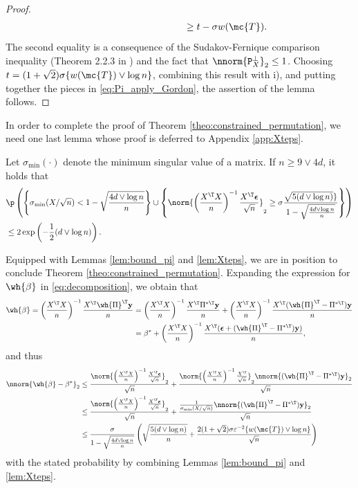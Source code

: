 \documentclass[11pt]{article}
\DeclareMathOperator{\pr}{\texttt{P}}
\def\y{\mathbf{y}}
\def\eps{\boldsymbol{\epsilon}}
\def\epss{\varepsilon}
\begin{document}
\begin{proof}
\begin{align*}
&\qquad \qquad \qquad \qquad \qquad \;\; \geq  t - \sigma w(\mc{T}). 
\end{align*}
The second equality is a consequence of the Sudakov-Fernique comparison inequality (Theorem 2.2.3 in \cite{AdlerTaylor2007}) and the fact that
$\nnorm{\pr_X^{\perp}}_2 \leq 1$. Choosing $t = (1 + \sqrt{2}) \sigma \{w(\mc{T}) \vee \log n \}$, combining this result with i), and putting together the pieces in \eqref{eq:Pi_apply_Gordon}, the assertion of the lemma follows.   
\end{proof}
\noindent In order to complete the proof of Theorem \ref{theo:constrained_permutation}, we need one last lemma whose proof is deferred to Appendix \ref{app:Xteps}.

\begin{lemma}\label{lem:Xteps} Let $\sigma_{\min}(\cdot)$ denote the minimum singular value of a matrix. If $n \geq 9 \vee 4d$, it holds that
\begin{align*}
  &\p \left( \left \{\sigma_{\min}(X / \sqrt{n}) < 1 - \sqrt{\frac{4 d \vee \log n}{n}} \right \}   \cup \left\{ \norm{ \left(\frac{X^{\T} X}{n} \right)^{-1} \frac{X^{\T} \eps}{\sqrt{n}}}_2 \geq \sigma \frac{\sqrt{5 (d \vee \log n)} \}}{1 - \sqrt{\frac{4 d \vee \log n}{n}}} \right \} \right)\\
  &\leq 2 \exp \left(-\frac{1}{2} (d \vee \log n) \right).  
\end{align*}
\end{lemma}
\noindent Equipped with Lemmas \ref{lem:bound_pi} and \ref{lem:Xteps}, we are in position to conclude
Theorem \ref{theo:constrained_permutation}. Expanding the expression for $\wh{\beta}$ in \eqref{eq:decomposition}, we obtain that
\begin{align*}
  \wh{\beta} = \left(\frac{X^{\T} X}{n} \right)^{-1} \frac{X^{\T} \wh{\Pi}^{\T} \y}{n} 
  &= \left(\frac{X^{\T} X}{n} \right)^{-1} \frac{X^{\T} \Pi^{*\T} \y}{n} + \left(\frac{X^{\T} X}{n} \right)^{-1} \frac{X^{\T} (\wh{\Pi}^{\T}  - \Pi^{*\T}) \y}{n} \\
  &= \beta^* + \left( \frac{X^{\T} X}{n} \right)^{-1} \frac{X^{\T} (\eps + (\wh{\Pi}^{\T} - \Pi^{*\T}) \y)}{n},  
\end{align*}
and thus
\begin{align*}
  \nnorm{\wh{\beta} - \beta^*}_2 &\leq  \frac{\norm{ \left(\frac{X^{\T} X}{n} \right)^{-1} \frac{X^{\T} \eps}{\sqrt{n}}}_2}{\sqrt{n}} + \frac{\norm{\left(\frac{X^{\T} X}{n} \right)^{-1} \frac{X^{\T}}{\sqrt{n}}}_2 \nnorm{(\wh{\Pi}^{\T} - \Pi^{*\T}) \y}_2}{\sqrt{n}} \\
                                 &\leq \frac{\norm{ \left(\frac{X^{\T} X}{n} \right)^{-1} \frac{X^{\T} \eps}{\sqrt{n}}}_2}{\sqrt{n}} + \frac{\frac{1}{\sigma_{\min}(X / \sqrt{n})}\nnorm{(\wh{\Pi}^{\T} - \Pi^{*\T}) \y}_2}{\sqrt{n}} \\
&\leq \frac{\sigma}{1 - \sqrt{\frac{4 d \vee \log n}{n}}} \left(\sqrt{\frac{5 (d \vee \log n)}{n}} + \frac{2 (1 + \sqrt{2})\sigma \epss^{-2} \{w(\mc{T}) \vee \log n\}}{\sqrt{n}} \right)                                   
\end{align*}
with the stated probability by combining Lemmas \ref{lem:bound_pi} and \ref{lem:Xteps}.   
\end{document}

